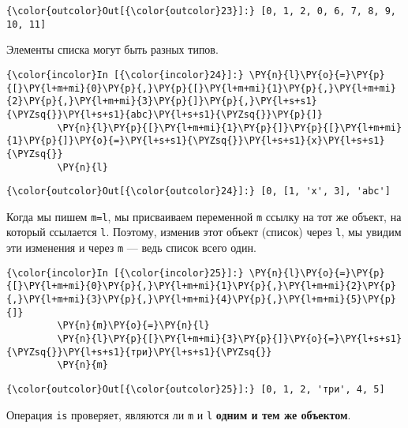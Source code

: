             \begin{Verbatim}[commandchars=\\\{\}]
{\color{outcolor}Out[{\color{outcolor}23}]:} [0, 1, 2, 0, 6, 7, 8, 9, 10, 11]
\end{Verbatim}
        
    Элементы списка могут быть разных типов.

    \begin{Verbatim}[commandchars=\\\{\}]
{\color{incolor}In [{\color{incolor}24}]:} \PY{n}{l}\PY{o}{=}\PY{p}{[}\PY{l+m+mi}{0}\PY{p}{,}\PY{p}{[}\PY{l+m+mi}{1}\PY{p}{,}\PY{l+m+mi}{2}\PY{p}{,}\PY{l+m+mi}{3}\PY{p}{]}\PY{p}{,}\PY{l+s+s1}{\PYZsq{}}\PY{l+s+s1}{abc}\PY{l+s+s1}{\PYZsq{}}\PY{p}{]}
         \PY{n}{l}\PY{p}{[}\PY{l+m+mi}{1}\PY{p}{]}\PY{p}{[}\PY{l+m+mi}{1}\PY{p}{]}\PY{o}{=}\PY{l+s+s1}{\PYZsq{}}\PY{l+s+s1}{x}\PY{l+s+s1}{\PYZsq{}}
         \PY{n}{l}
\end{Verbatim}

            \begin{Verbatim}[commandchars=\\\{\}]
{\color{outcolor}Out[{\color{outcolor}24}]:} [0, [1, 'x', 3], 'abc']
\end{Verbatim}
        
    Когда мы пишем \texttt{m=l}, мы присваиваем переменной \texttt{m} ссылку
на тот же объект, на который ссылается \texttt{l}. Поэтому, изменив этот
объект (список) через \texttt{l}, мы увидим эти изменения и через
\texttt{m} --- ведь список всего один.

    \begin{Verbatim}[commandchars=\\\{\}]
{\color{incolor}In [{\color{incolor}25}]:} \PY{n}{l}\PY{o}{=}\PY{p}{[}\PY{l+m+mi}{0}\PY{p}{,}\PY{l+m+mi}{1}\PY{p}{,}\PY{l+m+mi}{2}\PY{p}{,}\PY{l+m+mi}{3}\PY{p}{,}\PY{l+m+mi}{4}\PY{p}{,}\PY{l+m+mi}{5}\PY{p}{]}
         \PY{n}{m}\PY{o}{=}\PY{n}{l}
         \PY{n}{l}\PY{p}{[}\PY{l+m+mi}{3}\PY{p}{]}\PY{o}{=}\PY{l+s+s1}{\PYZsq{}}\PY{l+s+s1}{три}\PY{l+s+s1}{\PYZsq{}}
         \PY{n}{m}
\end{Verbatim}

            \begin{Verbatim}[commandchars=\\\{\}]
{\color{outcolor}Out[{\color{outcolor}25}]:} [0, 1, 2, 'три', 4, 5]
\end{Verbatim}
        
    Операция \texttt{is} проверяет, являются ли \texttt{m} и \texttt{l}
\textbf{одним и тем же объектом}.

